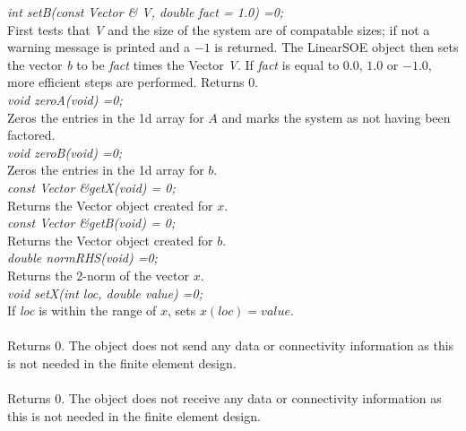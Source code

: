 {\em int setB(const Vector \& V, double fact = 1.0) =0;} \\
First tests that {\em V} and the size of the system are of compatable
sizes; if not a warning message is printed and a $-1$ is returned. The
LinearSOE object then sets the vector {\em b} to be {\em fact} times
the Vector {\em V}. If {\em fact} is equal to $0.0$, $1.0$ or $-1.0$,
more efficient steps are performed. Returns $0$. \\ 

{\em void zeroA(void) =0;} \\
Zeros the entries in the 1d array for $A$ and marks the system as not
having been factored. \\

{\em void zeroB(void) =0;} \\
Zeros the entries in the 1d array for $b$. \\

{\em const Vector \&getX(void) = 0;} \\
Returns the Vector object created for $x$. \\

{\em const Vector \&getB(void) = 0;} \\
Returns the Vector object created for $b$. \\

{\em double normRHS(void) =0;} \\
Returns the 2-norm of the vector $x$. \\

{\em void setX(int loc, double value) =0;}\\
If {\em loc} is within the range of $x$, sets $x(loc) = value$. \\


\\ 
Returns $0$. The object does not send any data or connectivity
information as this is not needed in the finite element design. \\

\\ 
Returns $0$. The object does not receive any data or connectivity
information as this is not needed in the finite element design.

